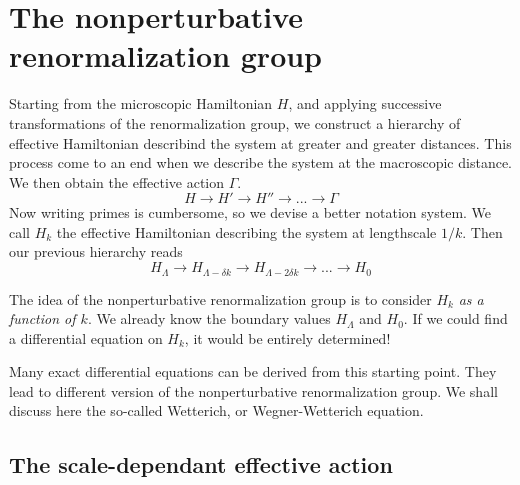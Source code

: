 \section{The nonperturbative renormalization group}

Starting from the microscopic Hamiltonian $H$, and applying successive transformations of the renormalization group, we construct a hierarchy of effective Hamiltonian describind the system at greater and greater distances. This process come to an end when we describe the system at the macroscopic distance. We then obtain the effective action $\Gamma$.
\begin{equation}
H \rightarrow H' \rightarrow H'' \rightarrow ... \rightarrow \Gamma
\end{equation}
Now writing primes is cumbersome, so we devise a better notation system. We call $H_k$ the effective Hamiltonian describing the system at lengthscale $1/k$. Then our previous hierarchy reads
\begin{equation}
H_\Lambda \rightarrow H_{\Lambda - \delta k} \rightarrow H_{\Lambda - 2 \delta k} \rightarrow ... \rightarrow H_0
\end{equation}

The idea of the nonperturbative renormalization group is to consider $H_k$ \textit{as a function of $k$}. We already know the boundary values $H_\Lambda$ and $H_0$. If we could find a differential equation on $H_k$, it would be entirely determined!

Many exact differential equations can be derived from this starting point. They lead to different version of the nonperturbative renormalization group. We shall discuss here the so-called Wetterich, or Wegner-Wetterich equation.

\subsection{The scale-dependant effective action}

